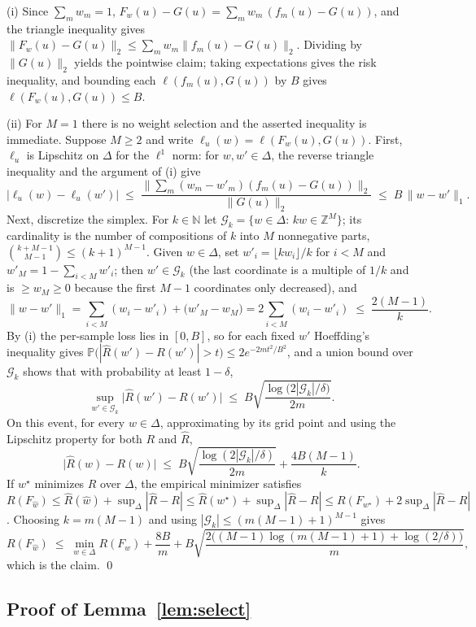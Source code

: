 (i) Since $\sum_m w_m=1$,
$F_w(u)-G(u)=\sum_m w_m\,(f_m(u)-G(u))$, and the triangle inequality gives
$\|F_w(u)-G(u)\|_2\le\sum_m w_m\|f_m(u)-G(u)\|_2$. Dividing by $\|G(u)\|_2$
yields the pointwise claim; taking expectations gives the risk inequality, and
bounding each $\ell(f_m(u),G(u))$ by $B$ gives $\ell(F_w(u),G(u))\le B$.

(ii) For $M=1$ there is no weight selection and the asserted inequality
is immediate. Suppose $M\ge2$ and write $\ell_u(w)=\ell(F_w(u),G(u))$. First, $\ell_u$ is Lipschitz on
$\Delta$ for the $\ell^1$ norm: for $w,w'\in\Delta$, the reverse triangle
inequality and the argument of (i) give
\[
|\ell_u(w)-\ell_u(w')|\;\le\;\frac{\big\|\sum_m (w_m-w'_m)(f_m(u)-G(u))\big\|_2}
{\|G(u)\|_2}\;\le\;B\,\|w-w'\|_1 .
\]
Next, discretize the simplex. For $k\in\mathbb N$ let
$\mathcal G_k=\{w\in\Delta:\,kw\in\mathbb Z^M\}$; its cardinality is the number
of compositions of $k$ into $M$ nonnegative parts,
$\binom{k+M-1}{M-1}\le (k+1)^{M-1}$. Given $w\in\Delta$, set
$w'_i=\lfloor kw_i\rfloor/k$ for $i<M$ and $w'_M=1-\sum_{i<M}w'_i$; then
$w'\in\mathcal G_k$ (the last coordinate is a multiple of $1/k$ and is
$\ge w_M\ge0$ because the first $M-1$ coordinates only decreased), and
\[
\|w-w'\|_1=\sum_{i<M}(w_i-w'_i)+\big(w'_M-w_M\big)
=2\sum_{i<M}(w_i-w'_i)\;\le\;\frac{2(M-1)}{k}.
\]
By (i) the per-sample loss lies in $[0,B]$, so for each fixed $w'$ Hoeffding's
inequality gives
$\mathbb P\big(|\widehat R(w')-R(w')|>t\big)\le2e^{-2mt^2/B^2}$, and a union
bound over $\mathcal G_k$ shows that with probability at least $1-\delta$,
\[
\sup_{w'\in\mathcal G_k}\big|\widehat R(w')-R(w')\big|\;\le\;
B\sqrt{\frac{\log\!\big(2|\mathcal G_k|/\delta\big)}{2m}} .
\]
On this event, for every $w\in\Delta$, approximating by its grid point and
using the Lipschitz property for both $R$ and $\widehat R$,
\[
\big|\widehat R(w)-R(w)\big|\;\le\;
B\sqrt{\frac{\log(2|\mathcal G_k|/\delta)}{2m}}+\frac{4B(M-1)}{k}.
\]
If $w^\star$ minimizes $R$ over $\Delta$, the empirical minimizer satisfies
$R(F_{\widehat w})\le\widehat R(\widehat w)+\sup_\Delta|\widehat R-R|
\le\widehat R(w^\star)+\sup_\Delta|\widehat R-R|
\le R(F_{w^\star})+2\sup_\Delta|\widehat R-R|$. Choosing $k=m(M-1)$ and using
$|\mathcal G_k|\le(m(M-1)+1)^{M-1}$ gives
\[
R(F_{\widehat w})\;\le\;\min_{w\in\Delta}R(F_w)+\frac{8B}{m}
+B\sqrt{\frac{2\big((M-1)\log(m(M-1)+1)+\log(2/\delta)\big)}{m}} ,
\]
which is the claim. \qed

\subsection{Proof of Lemma~\ref{lem:select}}
\label{proof:lem:select}

